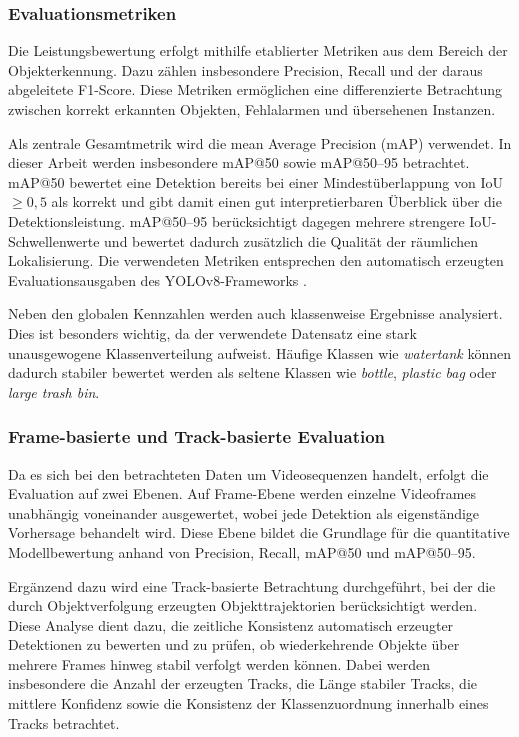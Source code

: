 \subsubsection{Evaluationsmetriken}

Die Leistungsbewertung erfolgt mithilfe etablierter Metriken aus dem Bereich der
Objekterkennung. Dazu zählen insbesondere Precision, Recall und der daraus
abgeleitete F1-Score. Diese Metriken ermöglichen eine differenzierte Betrachtung
zwischen korrekt erkannten Objekten, Fehlalarmen und übersehenen Instanzen.

Als zentrale Gesamtmetrik wird die mean Average Precision (mAP) verwendet.
In dieser Arbeit werden insbesondere mAP@50 sowie mAP@50--95 betrachtet.
mAP@50 bewertet eine Detektion bereits bei einer Mindestüberlappung von
IoU $\geq 0{,}5$ als korrekt und gibt damit einen gut interpretierbaren Überblick
über die Detektionsleistung. mAP@50--95 berücksichtigt dagegen mehrere
strengere IoU-Schwellenwerte und bewertet dadurch zusätzlich die Qualität der
räumlichen Lokalisierung. Die verwendeten Metriken entsprechen den automatisch
erzeugten Evaluationsausgaben des YOLOv8-Frameworks \cite{ultralytics2024}.

Neben den globalen Kennzahlen werden auch klassenweise Ergebnisse analysiert.
Dies ist besonders wichtig, da der verwendete Datensatz eine stark unausgewogene
Klassenverteilung aufweist. Häufige Klassen wie \textit{watertank} können dadurch
stabiler bewertet werden als seltene Klassen wie \textit{bottle}, \textit{plastic bag}
oder \textit{large trash bin}.

\subsubsection{Frame-basierte und Track-basierte Evaluation}

Da es sich bei den betrachteten Daten um Videosequenzen handelt, erfolgt die
Evaluation auf zwei Ebenen. Auf Frame-Ebene werden einzelne Videoframes
unabhängig voneinander ausgewertet, wobei jede Detektion als eigenständige
Vorhersage behandelt wird. Diese Ebene bildet die Grundlage für die quantitative
Modellbewertung anhand von Precision, Recall, mAP@50 und mAP@50--95.

Ergänzend dazu wird eine Track-basierte Betrachtung durchgeführt, bei der die
durch Objektverfolgung erzeugten Objekttrajektorien berücksichtigt werden. Diese
Analyse dient dazu, die zeitliche Konsistenz automatisch erzeugter Detektionen zu
bewerten und zu prüfen, ob wiederkehrende Objekte über mehrere Frames hinweg
stabil verfolgt werden können. Dabei werden insbesondere die Anzahl der erzeugten
Tracks, die Länge stabiler Tracks, die mittlere Konfidenz sowie die Konsistenz der
Klassenzuordnung innerhalb eines Tracks betrachtet.

